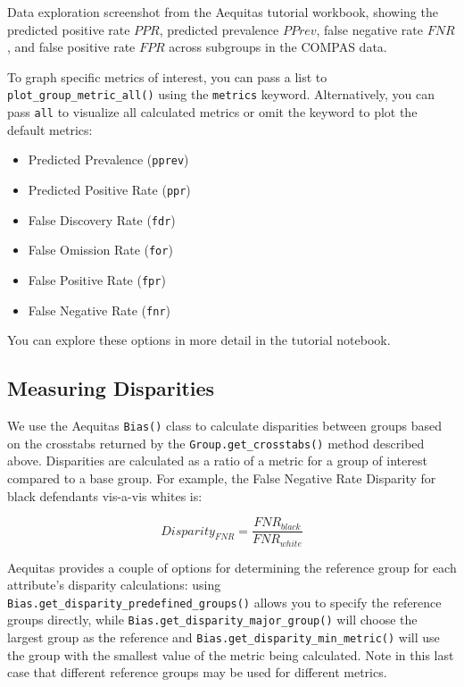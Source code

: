 \documentclass[]{krantz}
\begin{document}
Data exploration screenshot from the Aequitas tutorial workbook, showing
the predicted positive rate \(PPR\), predicted prevalence \(PPrev\),
false negative rate \(FNR\), and false positive rate \(FPR\) across
subgroups in the COMPAS data.

To graph specific metrics of interest, you can pass a list to
\texttt{plot\_group\_metric\_all()} using the \texttt{metrics} keyword.
Alternatively, you can pass
\texttt{\textquotesingle{}all\textquotesingle{}} to visualize all
calculated metrics or omit the keyword to plot the default metrics:

\begin{itemize}
\item
  Predicted Prevalence
  (\texttt{\textquotesingle{}pprev\textquotesingle{}})
\item
  Predicted Positive Rate
  (\texttt{\textquotesingle{}ppr\textquotesingle{}})
\item
  False Discovery Rate
  (\texttt{\textquotesingle{}fdr\textquotesingle{}})
\item
  False Omission Rate (\texttt{\textquotesingle{}for\textquotesingle{}})
\item
  False Positive Rate (\texttt{\textquotesingle{}fpr\textquotesingle{}})
\item
  False Negative Rate (\texttt{\textquotesingle{}fnr\textquotesingle{}})
\end{itemize}

You can explore these options in more detail in the tutorial notebook.

\subsection{Measuring Disparities}\label{measuring-disparities}

We use the Aequitas \texttt{Bias()} class to calculate disparities
between groups based on the crosstabs returned by the
\texttt{Group.get\_crosstabs()} method described above. Disparities are
calculated as a ratio of a metric for a group of interest compared to a
base group. For example, the False Negative Rate Disparity for black
defendants vis-a-vis whites is:

\[Disparity_{FNR} = \frac{FNR_{black}}{FNR_{white}}\]

Aequitas provides a couple of options for determining the reference
group for each attribute's disparity calculations: using
\texttt{Bias.get\_disparity\_predefined\_groups()} allows you to specify
the reference groups directly, while
\texttt{Bias.get\_disparity\_major\_group()} will choose the largest
group as the reference and \texttt{Bias.get\_disparity\_min\_metric()}
will use the group with the smallest value of the metric being
calculated. Note in this last case that different reference groups may
be used for different metrics.
\end{document}
